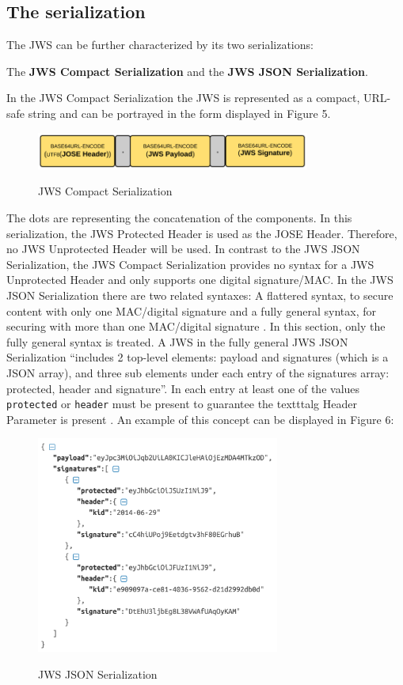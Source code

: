 \subsection{The serialization}
The JWS can be further characterized by its two serializations:\begin{center} The \textbf{JWS Compact Serialization} and the \textbf{JWS JSON Serialization}.\end{center}
In the JWS Compact Serialization the JWS is represented as a compact, URL-safe string \cite{rfc7515} and can be portrayed in the form displayed in Figure 5.
\begin{figure}
\centering
\includegraphics[width=9cm]{Pages/JWS/CompactSerialization.png}
\caption{JWS Compact Serialization}\cite{Compact}
\end{figure}
The dots are representing the concatenation of the components.
In this serialization, the JWS Protected Header is used as the JOSE Header. Therefore, no JWS Unprotected Header will be used.\newline
In contrast to the JWS JSON Serialization, the JWS Compact Serialization provides no syntax for a JWS Unprotected Header and only supports one digital signature/MAC.
In the JWS JSON Serialization there are two related syntaxes: A flattered syntax, to secure content with only one MAC/digital signature and a fully general syntax, for securing with more than one MAC/digital signature \cite{rfc7515}. In this section, only the fully general syntax is treated. 
A JWS in the fully general JWS JSON Serialization ``includes 2 top-level elements: payload and signatures (which is a JSON array), and three sub elements under each entry of the signatures array: protected, header and signature''\cite{Dummies}.
In each entry at least one of the values \texttt{protected} or \texttt{header} must be present to guarantee the texttt{alg} Header Parameter is present \cite{rfc7515}.\newline
An example of this concept can be displayed in Figure 6:\newline 
	\begin{figure}
\centering
\includegraphics[width=8cm]{Pages/JWS/JSONSerialization.png}
\caption{JWS JSON Serialization} \cite{JSON}
\end{figure}
